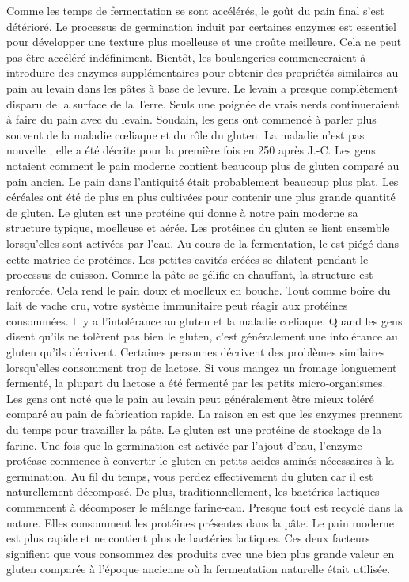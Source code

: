 Comme les temps de fermentation
se sont accélérés, le goût du pain final s'est détérioré.
Le processus de germination induit par certaines enzymes est essentiel
pour développer une texture plus moelleuse et une croûte meilleure. Cela
ne peut pas être accéléré indéfiniment. Bientôt, les boulangeries commenceraient
à introduire des enzymes supplémentaires pour obtenir des propriétés similaires
au pain au levain dans les pâtes à base de levure. Le levain a presque complètement
disparu de la surface de la Terre. Seuls une poignée
de vrais nerds continueraient à faire du pain avec du levain.
Soudain, les gens ont commencé à parler plus souvent de la maladie cœliaque et du rôle du gluten. La maladie n'est pas nouvelle ; elle a été décrite pour la première fois en 250 après J.-C. Les gens notaient comment le pain moderne contient beaucoup plus de gluten comparé au pain ancien. Le pain dans l'antiquité était probablement beaucoup plus plat. Les céréales ont été de plus en plus cultivées pour contenir une plus grande quantité de gluten. Le gluten est une protéine qui donne à notre pain moderne sa structure typique, moelleuse et aérée. Les protéines du gluten se lient ensemble lorsqu'elles sont activées par l'eau. Au cours de la fermentation, le  est piégé dans cette matrice de protéines. Les petites cavités créées se dilatent pendant le processus de cuisson. Comme la pâte se gélifie en chauffant, la structure est renforcée. Cela rend le pain doux et moelleux en bouche. Tout comme boire du lait de vache cru, votre système immunitaire peut réagir aux protéines consommées. Il y a l'intolérance au gluten et la maladie cœliaque. Quand les gens disent qu'ils ne tolèrent pas bien le gluten, c'est généralement une intolérance au gluten qu'ils décrivent. Certaines personnes décrivent des problèmes similaires lorsqu'elles consomment trop de lactose. Si vous mangez un fromage longuement fermenté, la plupart du lactose a été fermenté par les petits micro-organismes. Les gens ont noté que le pain au levain peut généralement être mieux toléré comparé au pain de fabrication rapide. La raison en est que les enzymes prennent du temps pour travailler la pâte. Le gluten est une protéine de stockage de la farine. Une fois que la germination est activée par l'ajout d'eau, l'enzyme protéase commence à convertir le gluten en petits acides aminés nécessaires à la germination. Au fil du temps, vous perdez effectivement du gluten car il est naturellement décomposé. De plus, traditionnellement, les bactéries lactiques commencent à décomposer le mélange farine-eau. Presque tout est recyclé dans la nature. Elles consomment les protéines présentes dans la pâte. Le pain moderne est plus rapide et ne contient plus de bactéries lactiques. Ces deux facteurs signifient que vous consommez des produits avec une bien plus grande valeur en gluten comparée à l'époque ancienne où la fermentation naturelle était utilisée.

